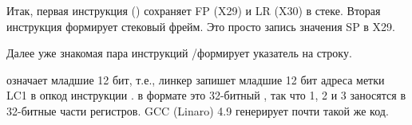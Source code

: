 



Итак, первая инструкция  () сохраняет \ac{FP} (X29) и \ac{LR} (X30) в стеке.
Вторая инструкция  формирует стековый фрейм.
Это просто запись значения \ac{SP} в X29.

Далее уже знакомая пара инструкций /\ADD формирует указатель на строку.

 означает младшие 12 бит, т.е., линкер запишет младшие 12 бит адреса метки LC1 в опкод инструкции \ADD.
 в формате \printf это 32-битный \Tint, так что 1, 2 и 3 заносятся в 32-битные части регистров.
\Optimizing GCC (Linaro) 4.9 генерирует почти такой же код.

